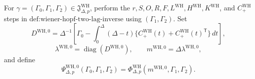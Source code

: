 For \(\gamma=(\Gamma_0,\Gamma_1,\Gamma_2)\in\mathfrak J_{\Delta,p}^{\mathrm{WH}}\), perform the \(r,S,O,R,F,L^{\mathrm{WH}},H^{\mathrm{WH}},K^{\mathrm{WH}}\), and \(C_{+}^{\mathrm{WH}}\) steps in \(\text{def:wiener-hopf-two-lag-inverse}\) using \((\Gamma_1,\Gamma_2)\).  Set
\[
 D^{\mathrm{WH},0}=\Delta^{-1}\!\left[
 \Gamma_0-\int_0^\Delta(\Delta-t)
 \{C_{+}^{\mathrm{WH}}(t)+C_{+}^{\mathrm{WH}}(t)^{\mathsf T}\}\,dt
 \right],
\]
\[
 \lambda^{\mathrm{WH},0}=\operatorname{diag}(D^{\mathrm{WH},0}),
 \qquad m^{\mathrm{WH},0}=\Delta\lambda^{\mathrm{WH},0},
\]
and define
\[
 \Psi_{\Delta,p}^{\mathrm{WH},0}(\Gamma_0,\Gamma_1,\Gamma_2)
 =\Phi_{\Delta,p}^{\mathrm{WH}}(m^{\mathrm{WH},0},\Gamma_1,\Gamma_2).
\]